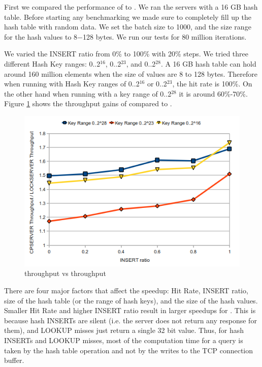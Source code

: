 First we compared the performance of \cpserver{} to \lockserver{}. We ran the servers with a 16 GB hash table. Before starting any benchmarking we 
made sure to completely fill up the hash table with random data. We set the batch size to 1000, and the size range for the hash values to 8$-$128 bytes. We run our tests 
for 80 million iterations.

We varied the INSERT ratio from 0\% to 100\% with 20\% steps. We tried three different Hash Key ranges: 0..2$^{16}$, 0..2$^{23}$, and 0..2$^{28}$. A 16 GB hash table
can hold around 160 million elements when the size of values are 8 to 128 bytes. Therefore when running with Hash Key ranges of 0..2$^{16}$ or 0..2$^{23}$, the hit rate 
is 100\%. On the other hand when running with a key range of 0..2$^{28}$ it is around 60\%-70\%. Figure \ref{fig:cpserverspeedup} shows the throughput gains of 
\cpserver{} compared to \lockserver{}.

\begin{figure}[!ht]
  \centering
  \includegraphics[width=\linewidth]{figs/cpserverspeedup.png}
  \caption{\cpserver{} throughput vs \lockserver{} throughput}
  \label{fig:cpserverspeedup}
\end{figure}

There are four major factors that affect the speedup: Hit Rate, INSERT ratio, size of the hash table (or the range of hash keys), and the size of the hash values. 
Smaller Hit Rate and higher INSERT ratio result in larger speedups for \cpserver{}. This is because hash INSERTs are silent (i.e. the server does not return 
any response for them), and LOOKUP misses just return a single 32 bit value. Thus, for hash INSERTs and LOOKUP misses, most of the computation time for a query is taken by 
the hash table operation and not by the writes to the TCP connection buffer. 


